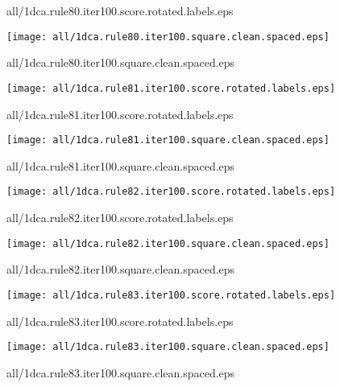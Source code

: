 \documentclass{article}
\begin{document}
{\footnotesize all/1dca.rule80.iter100.score.rotated.labels.eps}
\begin{center}
\begin{minipage}{\textwidth}
\texttt{[image: all/1dca.rule80.iter100.square.clean.spaced.eps]}
\end{minipage}
\end{center}
{\footnotesize all/1dca.rule80.iter100.square.clean.spaced.eps}
\begin{center}
\begin{minipage}{\textwidth}
\texttt{[image: all/1dca.rule81.iter100.score.rotated.labels.eps]}
\end{minipage}
\end{center}
{\footnotesize all/1dca.rule81.iter100.score.rotated.labels.eps}
\begin{center}
\begin{minipage}{\textwidth}
\texttt{[image: all/1dca.rule81.iter100.square.clean.spaced.eps]}
\end{minipage}
\end{center}
{\footnotesize all/1dca.rule81.iter100.square.clean.spaced.eps}
\begin{center}
\begin{minipage}{\textwidth}
\texttt{[image: all/1dca.rule82.iter100.score.rotated.labels.eps]}
\end{minipage}
\end{center}
{\footnotesize all/1dca.rule82.iter100.score.rotated.labels.eps}
\begin{center}
\begin{minipage}{\textwidth}
\texttt{[image: all/1dca.rule82.iter100.square.clean.spaced.eps]}
\end{minipage}
\end{center}
{\footnotesize all/1dca.rule82.iter100.square.clean.spaced.eps}
\begin{center}
\begin{minipage}{\textwidth}
\texttt{[image: all/1dca.rule83.iter100.score.rotated.labels.eps]}
\end{minipage}
\end{center}
{\footnotesize all/1dca.rule83.iter100.score.rotated.labels.eps}
\begin{center}
\begin{minipage}{\textwidth}
\texttt{[image: all/1dca.rule83.iter100.square.clean.spaced.eps]}
\end{minipage}
\end{center}
{\footnotesize all/1dca.rule83.iter100.square.clean.spaced.eps}
\end{document}
